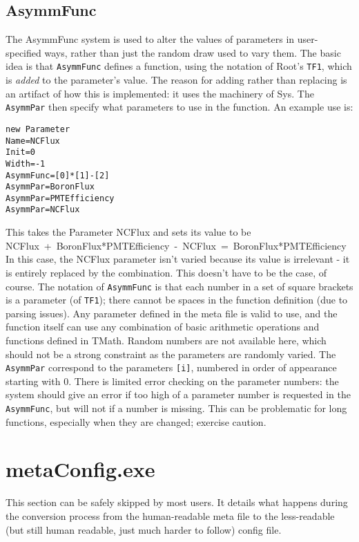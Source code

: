 \subsection{AsymmFunc}
\label{sec:AsymmFunc}
The AsymmFunc system is used to alter the values of parameters in
user-specified ways, rather than just the random draw used to vary
them.  The basic idea is that \verb|AsymmFunc| defines a function,
using the notation of Root's \verb|TF1|, which is \emph{added} to the
parameter's value.  The reason for adding rather than replacing is an
artifact of how this is implemented: it uses the machinery of Sys.
The \verb|AsymmPar| then specify what parameters to use in the
function.  An example use is:
\begin{verbatim}
new Parameter
Name=NCFlux
Init=0
Width=-1
AsymmFunc=[0]*[1]-[2]
AsymmPar=BoronFlux
AsymmPar=PMTEfficiency
AsymmPar=NCFlux
\end{verbatim}
This takes the Parameter NCFlux and sets its value to
be\medskip\\ 
\mbox{NCFlux + BoronFlux*PMTEfficiency - NCFlux =
  BoronFlux*PMTEfficiency}\medskip\\
In this case, the NCFlux parameter isn't varied because its value is
irrelevant - it is entirely replaced by the combination.  This doesn't
have to be the case, of course.  The notation of \verb|AsymmFunc| is
that each number in a set of square brackets is a parameter (of
\verb|TF1|); there cannot be spaces in the function definition (due to
parsing issues).  Any parameter defined in the meta file is valid to
use, and the function itself can use any combination of basic arithmetic 
operations and functions defined in TMath.  Random numbers are not
available here, which should not be a strong constraint as the
parameters are randomly varied.  The \verb|AsymmPar| correspond to the
parameters \verb|[i]|, numbered in order of appearance starting with
$0$.  There is limited error checking on the parameter numbers: the
system should give an error if too high of a parameter number is
requested in the \verb|AsymmFunc|, but will not if a number is
missing.  This can be problematic for long functions, especially when
they are changed; exercise caution.

\section{metaConfig.exe}
\label{sec:metaConfig}
This section can be safely skipped by most users.  It details what
happens during the conversion process from the human-readable meta
file to the less-readable (but still human readable, just much harder
to follow) config file.

